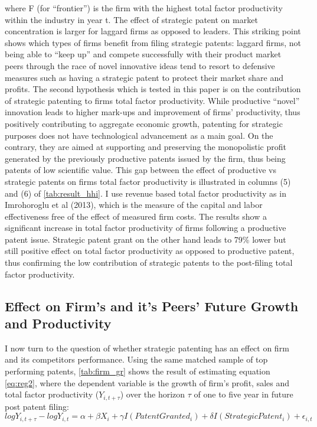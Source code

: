 \documentclass[11pt]{article}
\begin{document}
\noindent where F (for “frontier”) is the firm with the highest total factor productivity within the industry in year t. 
The effect of strategic patent on market concentration is larger for laggard firms as opposed to leaders. This striking point shows which types of firms benefit from filing strategic patents: laggard firms, not being able to “keep up” and compete successfully with their product market peers through the race of novel innovative ideas tend to resort to defensive measures such as having a strategic patent to protect their market share and profits. 
The second hypothesis which is tested in this paper is on the contribution of strategic patenting to firms total factor productivity. While productive “novel” innovation leads to higher mark-ups and improvement of firms’ productivity, thus positively contributing to aggregate economic growth, patenting for strategic purposes does not have technological advancement as a main goal. On the contrary, they are aimed at supporting and preserving the monopolistic profit generated by the previously productive patents issued by the firm, thus being patents of low scientific value. This gap between the effect of productive vs strategic patents on firms total factor productivity is illustrated in columns (5) and (6) of \autoref{tab:result_hhi}.  I use revenue based total factor productivity as in \color{blue}Imrohoroglu et al (2013)\color{black}, which is the measure of the capital and labor effectiveness free of the effect of measured firm costs. The results show a significant increase in total factor productivity of firms following a productive patent issue. Strategic patent grant on the other hand leads to 79\% lower but still positive effect on total factor productivity as opposed to productive patent, thus confirming the low contribution of strategic patents to the post-filing total factor productivity. 
   
\subsection{Effect on Firm’s and it’s Peers’ Future Growth and Productivity}
I now turn to the question of whether strategic patenting has an effect on firm and its competitors performance. Using the same matched sample of top performing patents, \autoref{tab:firm_gr}  shows the result of estimating equation \eqref{eq:reg2}, where the dependent variable is the growth of firm’s profit, sales and total factor productivity ($Y_{i, t+\tau}$) over the horizon $\tau$ of one to five year in future post patent filing:
\begin{equation}
\label{eq:reg2}
log Y_{i,t+\tau} - log Y_{i,t}  = \alpha + \beta X_i + \gamma I(PatentGranted_i) + \delta I(StrategicPatent_i)+\epsilon_{i,t}
\end{equation}
\end{document}
